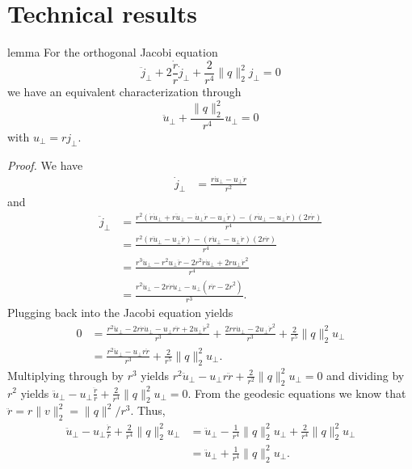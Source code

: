 \documentclass{article}
\begin{document}
\appendix

\section{Technical results}

\begin{restatable}{lemma}{} \label{lemma: orthog jacobi equation}
    For the orthogonal Jacobi equation
    \begin{equation}
        \ddot j_{\perp} +  2\frac{\dot r}{r}\dot j_{\perp} + \frac{2}{r^4}\|q\|_2^2j_{\perp} = 0
    \end{equation}
    we have an equivalent characterization through
    \begin{equation}
        \ddot u_{\perp} + \frac{\|q\|_2^2}{r^4}u_\perp = 0
    \end{equation}
    with $u_\perp = rj_{\perp}$.
\end{restatable}
\noindent \textit{Proof.} We have
\begin{align}
    \dot j_{\perp} &= \frac{r\dot u_{\perp} - u_\perp \dot r}{r^2}
\end{align}
and 
\begin{align}
    \ddot j_{\perp} &= \frac{r^2(\dot r\dot u_{\perp} + r \ddot u_{\perp} - \dot u_\perp \dot r - u_\perp \ddot r) - (r\dot u_{\perp} - u_\perp \dot r)(2r\dot r)}{r^4} \\
    &= \frac{r^2(r \ddot u_{\perp} - u_\perp \ddot r) - (r\dot u_{\perp} - u_\perp \dot r)(2r\dot r)}{r^4} \\
    &= \frac{r^3 \ddot u_{\perp} - r^2u_\perp \ddot r - 2r^2\dot r\dot u_{\perp} + 2ru_\perp \dot r^2}{r^4} \\
    &= \frac{r^2 \ddot u_{\perp} - 2r\dot r\dot u_{\perp}- u_\perp\left(r \ddot r - 2 \dot r^2\right)}{r^3}.
\end{align}
Plugging back into the Jacobi equation yields
\begin{align}
    0 &= \frac{r^2 \ddot u_{\perp} - 2r\dot r\dot u_{\perp}- u_\perp r\ddot r + 2 u_{\perp}\dot r^2}{r^3} + \frac{2\dot rr\dot u_{\perp} - 2u_\perp \dot r^2}{r^3} + \frac{2}{r^5}\|q\|_2^2u_{\perp} \\
    &= \frac{r^2 \ddot u_{\perp} - u_\perp r\ddot r}{r^3} + \frac{2}{r^5}\|q\|_2^2u_{\perp}.
\end{align}
Multiplying through by $r^3$ yields $r^2 \ddot u_{\perp} - u_\perp r\ddot r + \frac{2}{r^2}\|q\|_2^2u_{\perp} = 0$ and dividing by $r^2$ yields $\ddot u_{\perp} - u_\perp \frac{\ddot r}{r} + \frac{2}{r^4}\|q\|_2^2u_{\perp} = 0$. From the geodesic equations we know that $\ddot r = r\|v\|_2^2 = \|q\|^2/r^3$. Thus,
\begin{align}
    \ddot u_{\perp} - u_\perp \frac{\ddot r}{r} + \frac{2}{r^4}\|q\|_2^2u_{\perp} &= \ddot u_{\perp} -  \frac{1}{r^4}\|q\|_2^2u_\perp + \frac{2}{r^4}\|q\|_2^2u_{\perp} \\
    &= \ddot u_{\perp} + \frac{1}{r^4}\|q\|_2^2u_\perp.
\end{align}
\end{document}
